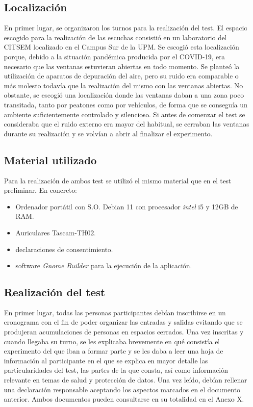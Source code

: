 \documentclass[11pt,a4paper,twoside]{book}
\begin{document}
            \subsection*{Localización}
                En primer lugar, se organizaron los turnos para la realización del test. El espacio escogido para la realización de las escuchas consistió en un laboratorio del CITSEM localizado en el Campus Sur de la UPM. Se escogió esta localización porque, debido a la situación pandémica producida por el COVID-19, era necesario que las ventanas estuvieran abiertas en todo momento. Se planteó la utilización de aparatos de depuración del aire, pero su ruido era comparable o más molesto todavía que la realización del mismo con las ventanas abiertas. No obstante, se escogió una localización donde las ventanas daban a una zona poco transitada, tanto por peatones como por vehículos, de forma que se conseguía un ambiente suficientemente controlado y silencioso. Si antes de comenzar el test se consideraba que el ruido externo era mayor del habitual, se cerraban las ventanas durante su realización y se volvían a abrir al finalizar el experimento.
            
            \subsection*{Material utilizado}
                Para la realización de ambos test se utilizó el mismo material que en el test preliminar. En concreto:
                \begin{itemize}
                    \item Ordenador portátil con S.O. Debian 11 con procesador \textit{intel} i5 y 12GB de RAM.
                    \item Auriculares Tascam-TH02.
                    \item declaraciones de consentimiento.
                    \item software \textit{Gnome Builder} para la ejecución de la aplicación.
                \end{itemize}
                
            \subsection*{Realización del test}
                En primer lugar, todas las personas participantes debían inscribirse en un cronograma con el fin de poder organizar las entradas y salidas evitando que se produjeran acumulaciones de personas en espacios cerrados. Una vez inscritas y cuando llegaba su turno, se les explicaba brevemente en qué consistía el experimento del que iban a formar parte y se les daba a leer una hoja de información al participante en el que se explica en mayor detalle las particularidades del test, las partes de la que consta, así como información relevante en temas de salud y protección de datos. Una vez leído, debían rellenar una declaración responsable aceptando los aspectos marcados en el documento anterior. Ambos documentos pueden consultarse en su totalidad en el Anexo X.
                
\end{document}
